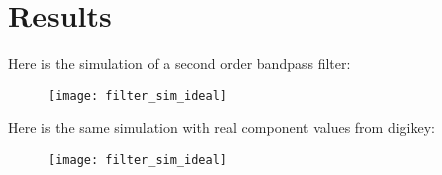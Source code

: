 \documentclass[12pt, letterpaper]{article}
\begin{document}
\section{Results}
Here is the simulation of a second order bandpass filter:
\begin{figure}[h]
\texttt{[image: filter\_sim\_ideal]}
\end{figure}

\clearpage

Here is the same simulation with real component values from digikey:
\begin{figure}[h]
    \texttt{[image: filter\_sim\_ideal]}
\end{figure}
\end{document}
